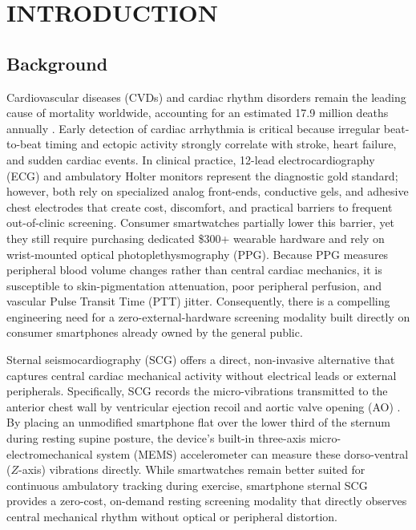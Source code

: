 \chapter{INTRODUCTION}

\section{Background}

Cardiovascular diseases (CVDs) and cardiac rhythm disorders remain the leading cause of mortality worldwide, accounting for an estimated 17.9 million deaths annually \cite{who2025cvd}. Early detection of cardiac arrhythmia is critical because irregular beat-to-beat timing and ectopic activity strongly correlate with stroke, heart failure, and sudden cardiac events. In clinical practice, 12-lead electrocardiography (ECG) and ambulatory Holter monitors represent the diagnostic gold standard; however, both rely on specialized analog front-ends, conductive gels, and adhesive chest electrodes that create cost, discomfort, and practical barriers to frequent out-of-clinic screening. Consumer smartwatches partially lower this barrier, yet they still require purchasing dedicated \$300+ wearable hardware and rely on wrist-mounted optical photoplethysmography (PPG). Because PPG measures peripheral blood volume changes rather than central cardiac mechanics, it is susceptible to skin-pigmentation attenuation, poor peripheral perfusion, and vascular Pulse Transit Time (PTT) jitter. Consequently, there is a compelling engineering need for a zero-external-hardware screening modality built directly on consumer smartphones already owned by the general public.

Sternal seismocardiography (SCG) offers a direct, non-invasive alternative that captures central cardiac mechanical activity without electrical leads or external peripherals. Specifically, SCG records the micro-vibrations transmitted to the anterior chest wall by ventricular ejection recoil and aortic valve opening (AO) \cite{inan2015ballistocardiography, tadi2016realtime}. By placing an unmodified smartphone flat over the lower third of the sternum during resting supine posture, the device's built-in three-axis micro-electromechanical system (MEMS) accelerometer can measure these dorso-ventral ($Z$-axis) vibrations directly. While smartwatches remain better suited for continuous ambulatory tracking during exercise, smartphone sternal SCG provides a zero-cost, on-demand resting screening modality that directly observes central mechanical rhythm without optical or peripheral distortion.

